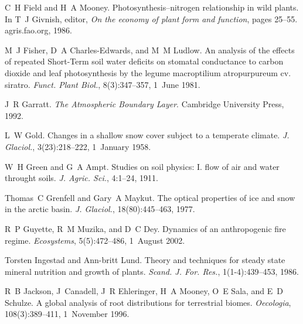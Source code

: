\begin{DoxyDescription}
\item[\label{_CITEREF_Field1986-kd}%
\mbox{[}33\mbox{]}]C~H Field and H~A Mooney. Photosynthesis--nitrogen relationship in wild plants. In T~J Givnish, editor, {\itshape On the economy of plant form and function}, pages 25--55. agris.\+fao.\+org, 1986.


\item[\label{_CITEREF_Fisher1981-xf}%
\mbox{[}34\mbox{]}]M~J Fisher, D~A Charles-\/\+Edwards, and M~M Ludlow. An analysis of the effects of repeated Short-\/\+Term soil water deficits on stomatal conductance to carbon dioxide and leaf photosynthesis by the legume macroptilium atropurpureum cv. siratro. {\itshape Funct. Plant Biol.}, 8(3)\+:347--357, 1~June 1981. 


\item[\label{_CITEREF_Garratt1992-dt}%
\mbox{[}35\mbox{]}]J~R Garratt. {\itshape The Atmospheric Boundary Layer}. Cambridge University Press, 1992.


\item[\label{_CITEREF_Gold1958-ng}%
\mbox{[}36\mbox{]}]L~W Gold. Changes in a shallow snow cover subject to a temperate climate. {\itshape J. Glaciol.}, 3(23)\+:218--222, 1~January 1958.


\item[\label{_CITEREF_Green1911-gy}%
\mbox{[}37\mbox{]}]W~H Green and G~A Ampt. Studies on soil physics\+: I. flow of air and water throught soils. {\itshape J. Agric. Sci.}, 4\+:1--24, 1911.


\item[\label{_CITEREF_Grenfell1977-pi}%
\mbox{[}38\mbox{]}]Thomas~C Grenfell and Gary~A Maykut. The optical properties of ice and snow in the arctic basin. {\itshape J. Glaciol.}, 18(80)\+:445--463, 1977.


\item[\label{_CITEREF_Guyette2002-rc}%
\mbox{[}39\mbox{]}]R~P Guyette, R~M Muzika, and D~C Dey. Dynamics of an anthropogenic fire regime. {\itshape Ecosystems}, 5(5)\+:472--486, 1~August 2002. 


\item[\label{_CITEREF_Ingestad1986-td}%
\mbox{[}40\mbox{]}]Torsten Ingestad and Ann-\/britt Lund. Theory and techniques for steady state mineral nutrition and growth of plants. {\itshape Scand. J. For. Res.}, 1(1-\/4)\+:439--453, 1986. 


\item[\label{_CITEREF_Jackson1996-va}%
\mbox{[}41\mbox{]}]R~B Jackson, J~Canadell, J~R Ehleringer, H~A Mooney, O~E Sala, and E~D Schulze. A global analysis of root distributions for terrestrial biomes. {\itshape Oecologia}, 108(3)\+:389--411, 1~November 1996. 



\end{DoxyDescription}
